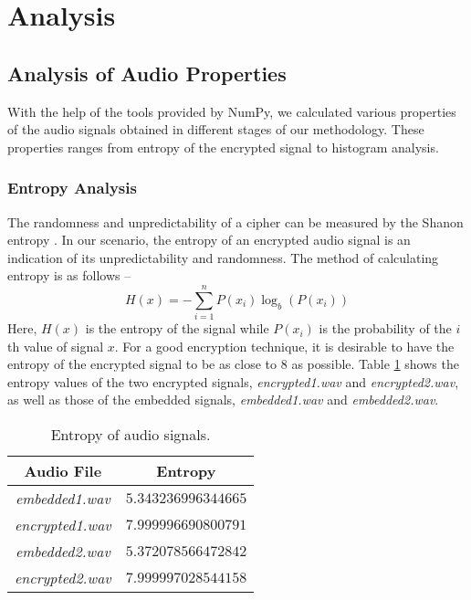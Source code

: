 \documentclass{article}
\begin{document}
\section{Analysis}
\label{sec:analysis}
\subsection{Analysis of Audio Properties}
With the help of the tools provided by NumPy, we calculated various properties of the audio signals obtained in different stages of our methodology. These properties ranges from entropy of the encrypted signal to histogram analysis.
\subsubsection{Entropy Analysis}
The randomness and unpredictability of a cipher can be measured by the Shanon entropy \cite{shannon1948mathematical}. In our scenario, the entropy of an encrypted audio signal is an indication of its unpredictability and randomness. The method of calculating entropy is as follows --
\[H(x)=-\sum_{i=1}^{n}P(x_i)\log_{b}(P(x_i))\]
Here, $H(x)$ is the entropy of the signal while $P(x_i)$ is the probability of the $i$th value of signal $x$. For a good encryption technique, it is desirable to have the entropy of the encrypted signal to be as close to $8$ as possible. Table \ref{table:entropy} shows the entropy values of the two encrypted signals, \textit{encrypted1.wav} and \textit{encrypted2.wav}, as well as those of the embedded signals, \textit{embedded1.wav} and \textit{embedded2.wav}.
\begin{table}[!h]
    \begin{center}
        \caption{Entropy of audio signals.}
        \begin{tabular}{cc}
            \hline
            Audio File              & Entropy             \\ \hline
            \textit{embedded1.wav}  & $5.343236996344665$ \\
            \textit{encrypted1.wav} & $7.999996690800791$ \\ \hdashline
            \textit{embedded2.wav}  & $5.372078566472842$ \\
            \textit{encrypted2.wav} & $7.999997028544158$ \\ \hline
        \end{tabular}
        \label{table:entropy}
    \end{center}
\end{table}
\end{document}
